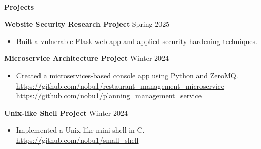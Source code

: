 \begin{flushleft}
    \hrulefill \\
    \begin{large}
        \begin{center}\textbf{Projects} \end{center}
    \end{large} 
\end{flushleft}
\textbf{Website Security Research Project} \hfill Spring 2025
\begin{itemize}
    \item Built a vulnerable Flask web app and applied security hardening techniques.
\end{itemize}
\textbf{Microservice Architecture Project} \hfill Winter 2024
\begin{itemize}
    \item Created a microservices-based console app using Python and ZeroMQ. \\
	\url{https://github.com/nobu1/restaurant_management_microservice} \\
	\url{https://github.com/nobu1/planning_management_service}
\end{itemize}
\textbf{Unix-like Shell Project} \hfill Winter 2024
\begin{itemize}
    \item Implemented a Unix-like mini shell in C. \\
	\url{https://github.com/nobu1/small_shell}
\end{itemize}